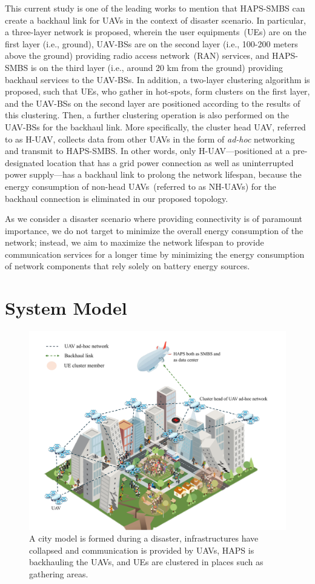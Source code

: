 \documentclass[conference, a4paper]{IEEEtran}
\begin{document}
This current study is one of the leading works to mention that HAPS-SMBS can create a backhaul link for UAVs in the context of disaster scenario.
In particular, a three-layer network is proposed, wherein the user equipments~(UEs) are on the first layer (i.e., ground), UAV-BSs are on the second layer (i.e., 100-200 meters above the ground) providing radio access network~(RAN) services, and HAPS-SMBS is on the third layer (i.e., around 20 km from the ground) providing backhaul services to the UAV-BSs.
In addition, a two-layer clustering algorithm is proposed, such that UEs, who gather in hot-spots, form clusters on the first layer, and the UAV-BSs on the second layer are positioned according to the results of this clustering. 
Then, a further clustering operation is also performed on the UAV-BSs for the backhaul link.
More specifically, the cluster head UAV, referred to as H-UAV, collects data from other UAVs in the form of \textit{ad-hoc} networking and transmit to HAPS-SMBS.
In other words, only H-UAV---positioned at a pre-designated location that has a grid power connection as well as uninterrupted power supply---has a backhaul link to prolong the network lifespan, because the energy consumption of non-head UAVs~(referred to as NH-UAVs) for the backhaul connection is eliminated in our proposed topology.

As we consider a  disaster scenario where providing connectivity is of paramount importance, we do not target to minimize the overall energy consumption of the network; instead, we aim to maximize the network lifespan to provide communication services for a longer time by minimizing the energy consumption of network components that rely solely on battery energy sources.
  
\section{System Model}
\begin{figure}[hbt!]
    \centering
     \shorthandoff{=}
     \includegraphics[width=.6\linewidth,trim={1cm 0cm 1cm 1cm},clip]{Figures/system_model.pdf}
    \shorthandoff{=}
    \caption{A city model is formed during a disaster, infrastructures have collapsed and communication is provided by UAVs, HAPS is backhauling the UAVs, and UEs are clustered in places such as gathering areas.}
    \label{fig:networkmodel}
\end{figure}
\end{document}
